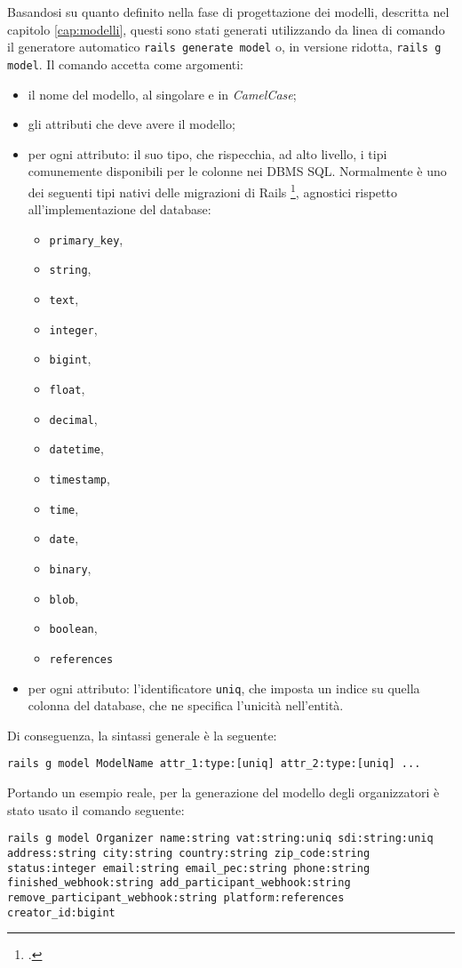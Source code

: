 Basandosi su quanto definito nella fase di progettazione dei modelli, descritta nel capitolo \ref{cap:modelli}, questi sono stati generati utilizzando da linea di comando il generatore automatico \verb|rails generate model| o, in versione ridotta, \verb|rails g model|. Il comando accetta come argomenti:
\begin{itemize}
	\item il nome del modello, al singolare e in \emph{CamelCase};
	\item gli attributi che deve avere il modello;
	\item per ogni attributo: il suo tipo, che rispecchia, ad alto livello, i tipi comunemente disponibili per le colonne nei DBMS SQL. Normalmente è uno dei seguenti tipi nativi delle migrazioni di Rails \footcite{site:migration-types}, agnostici rispetto all'implementazione del database:
	\begin{itemize}
		\item \verb|primary_key|,
		\item \verb|string|,
		\item \verb|text|,
		\item \verb|integer|,
		\item \verb|bigint|,
		\item \verb|float|,
		\item \verb|decimal|,
		\item \verb|datetime|,
		\item \verb|timestamp|,
		\item \verb|time|,
		\item \verb|date|,
		\item \verb|binary|,
		\item \verb|blob|,
		\item \verb|boolean|,
		\item \verb|references|
	\end{itemize}
	\item per ogni attributo: l'identificatore \verb|uniq|, che imposta un indice su quella colonna del database, che ne specifica l'unicità nell'entità.
\end{itemize}
Di conseguenza, la sintassi generale è la seguente:
\begin{verbatim}
rails g model ModelName attr_1:type:[uniq] attr_2:type:[uniq] ...
\end{verbatim}
Portando un esempio reale, per la generazione del modello degli organizzatori è stato usato il comando seguente:
\begin{verbatim}
rails g model Organizer name:string vat:string:uniq sdi:string:uniq address:string city:string country:string zip_code:string status:integer email:string email_pec:string phone:string finished_webhook:string add_participant_webhook:string remove_participant_webhook:string platform:references creator_id:bigint
\end{verbatim}
